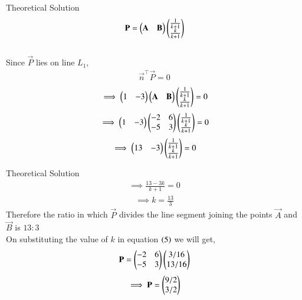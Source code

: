 \documentclass{beamer}
\begin{document}
\begin{frame}{Theoretical Solution}
\begin{align}
    \mathbf{P}=\begin{pmatrix}\mathbf{A} & \mathbf{B}\end{pmatrix}\begin{pmatrix}\frac{1}{k+1}\\\frac{k}{k+1}\end{pmatrix}
\end{align}\\
Since $\vec{P}$ lies on line $L_1$,
\begin{align}
    \vec{n}^{\top}\vec{P}=0
\end{align}
\begin{align}
    \implies \begin{pmatrix}1 & -3\end{pmatrix}\begin{pmatrix}\mathbf{A} & \mathbf{B}\end{pmatrix}\begin{pmatrix}\frac{1}{k+1}\\\frac{k}{k+1}\end{pmatrix}=0
\end{align}
\begin{align}
    \implies \begin{pmatrix}1 & -3\end{pmatrix}\begin{pmatrix}-2 & 6\\-5 & 3\end{pmatrix}\begin{pmatrix}\frac{1}{k+1}\\\frac{k}{k+1}\end{pmatrix}=0
\end{align}
\begin{align}
    \implies \begin{pmatrix}13 & -3\end{pmatrix}\begin{pmatrix}\frac{1}{k+1}\\\frac{k}{k+1}\end{pmatrix}=0
\end{align}
\end{frame}


\begin{frame}{Theoretical Solution}
\begin{align}
    \implies \frac{13-3k}{k+1} = 0
\end{align}
\begin{align}
    \implies k=\frac{13}{3}
\end{align}
Therefore the ratio in which $\vec{P}$ divides the line segment joining the points $\vec{A}$ and $\vec{B}$ is $13:3$\\
On substituting the value of $k$ in equation $\left(5\right)$ we will get,
\begin{align}
    \mathbf{P}=\begin{pmatrix}-2 & 6\\-5 & 3\end{pmatrix}\begin{pmatrix}3/16 \\ 13/16\end{pmatrix}
\end{align}
\begin{align}
    \implies\vec{P}=\begin{myvec}{9/2\\3/2}\end{myvec}
\end{align}\\
\end{frame}
\end{document}
